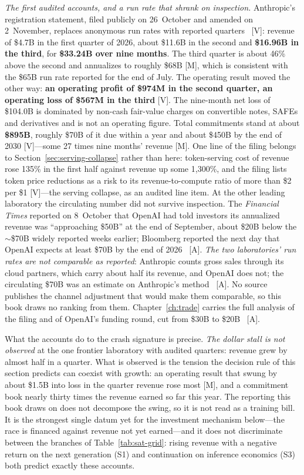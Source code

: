 \emph{The first audited accounts, and a run rate that shrank on inspection.} Anthropic's registration statement, filed publicly on 26~October and amended on 2~November, replaces anonymous run rates with reported quarters~\cite{cap-anthropic-s1} [V]: revenue of \$4.7B in the first quarter of 2026, about \$11.6B in the second and \textbf{\$16.96B in the third}, for \textbf{\$33.24B over nine months}. The third quarter is about 46\% above the second and annualizes to roughly \$68B [M], which is consistent with the \$65B run rate reported for the end of July. The operating result moved the other way: \textbf{an operating profit of \$974M in the second quarter, an operating loss of \$567M in the third} [V]. The nine-month net loss of \$104.0B is dominated by non-cash fair-value charges on convertible notes, SAFEs and derivatives and is not an operating figure. Total commitments stand at about \textbf{\$895B}, roughly \$70B of it due within a year and about \$450B by the end of 2030 [V]---some 27 times nine months' revenue [M]. One line of the filing belongs to Section~\ref{sec:serving-collapse} rather than here: token-serving cost of revenue rose 135\% in the first half against revenue up some 1{,}300\%, and the filing lists token price reductions as a risk to its revenue-to-compute ratio of more than \$2 per \$1 [V]---the serving collapse, as an audited line item. At the other leading laboratory the circulating number did not survive inspection. The \emph{Financial Times} reported on 8~October that OpenAI had told investors its annualized revenue was ``approaching \$50B'' at the end of September, about \$20B below the $\sim$\$70B widely reported weeks earlier; Bloomberg reported the next day that OpenAI expects at least \$70B by the end of 2026~\cite{mdl-openai-50bn} [A]. \emph{The two laboratories' run rates are not comparable as reported}: Anthropic counts gross sales through its cloud partners, which carry about half its revenue, and OpenAI does not; the circulating \$70B was an estimate on Anthropic's method~\cite{mdl-openai-50bn,cap-anthropic-s1} [A]. No source publishes the channel adjustment that would make them comparable, so this book draws no ranking from them. Chapter~\ref{ch:trade} carries the full analysis of the filing and of OpenAI's funding round, cut from \$30B to \$20B~\cite{mdl-openai-50bn} [A].

What the accounts do to the crash signature is precise. \emph{The dollar stall is not observed} at the one frontier laboratory with audited quarters: revenue grew by almost half in a quarter. What is observed is the tension the decision rule of this section predicts can coexist with growth: an operating result that swung by about \$1.5B into loss in the quarter revenue rose most [M], and a commitment book nearly thirty times the revenue earned so far this year. The reporting this book draws on does not decompose the swing, so it is not read as a training bill. It is the strongest single datum yet for the investment mechanism below---the race is financed against revenue not yet earned---and it does not discriminate between the branches of Table~\ref{tab:sat-grid}: rising revenue with a negative return on the next generation (S1) and continuation on inference economics (S3) both predict exactly these accounts.

